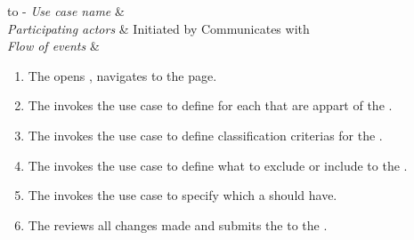 \documentclass{article}
\begin{document}
%
%
\begin{table}[h!]
\tabulinesep =1.5mm
\begin{tabu} to 
	\tabucline[1.5pt]-
	\textit{Use case name} & \manageStudy \\
	\hline
	\textit{Participating actors} & Initiated by \researcher \newline Communicates with \client \\
	\hline
	\textit{Flow of events} &
	\vspace{-3mm}

\begin{enumerate}[leftmargin=*,topsep=0pt,itemsep=-1ex]
	\item The \researcher opens \client, navigates to the \studyConfigUI page.\\
	\item The \researcher invokes the \manageRole use case to define \role for each \user that are appart of the \studycon.\\
	\item The \researcher invokes the \manageClassCrit use case to define classification criterias for the \studycon.\\
	\item The \researcher invokes the \manageInExCrit use case to define  what to exclude or include to the \studycon.\\
	\item The \researcher invokes the \manageTask use case to specify which \task a \user should have.\\
	\item The \researcher reviews all changes made and submits the \studycon to the \studyConfigServer.\\	
			
\end{enumerate}
\end{tabu}
\end{table}
\end{document}
